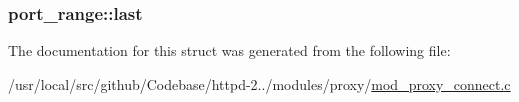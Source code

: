 \subsubsection[{\texorpdfstring{last}{last}}]{ port\+\_\+range\+::last}\hypertarget{structport__range_aea12a925c88afd137f2d8abe84dd31c8}{}\label{structport__range_aea12a925c88afd137f2d8abe84dd31c8}


The documentation for this struct was generated from the following file\+:\begin{DoxyCompactItemize}
\item 
/usr/local/src/github/\+Codebase/httpd-\/2../modules/proxy/\hyperlink{mod__proxy__connect_8c}{mod\+\_\+proxy\+\_\+connect.\+c}\end{DoxyCompactItemize}
